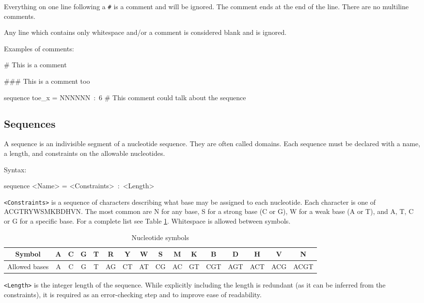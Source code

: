 \documentclass{article}
\newenvironment{code}
{\vspace{-0.1in}\par\begin{list}{}{
\setlength{\listparindent}{0pt}
\raggedright
\setlength{\itemsep}{0pt}
\setlength{\parsep}{0pt}
\normalfont\ttfamily}
 \item[]}
{\end{list}\vspace{-0.1in}}
\begin{document}
Everything on one line following a \texttt{\#} is a comment and will be ignored. The comment ends at the end of the line. There are no multiline comments.

Any line which contains only whitespace and/or a comment is considered blank and is ignored.

\pagebreak
Examples of comments:
\begin{code}
\# This is a comment

\#\#\# This is a comment too

sequence toe\_x = NNNNNN~:~6   \# This comment could talk about the sequence 
\end{code}

\subsection{Sequences}

A sequence is an indivisible segment of a nucleotide sequence. They are often called domains. Each sequence must be declared with a name, a length, and constraints on the allowable nucleotides.

Syntax:
\begin{code}
sequence <Name> = <Constraints>~:~<Length>
\end{code}
\texttt{<Constraints>} is a sequence of characters describing what base may be assigned to each nucleotide. Each character is one of ACGTRYWSMKBDHVN. The most common are N for any base, S for a strong base (C or G), W for a weak base (A or T), and A, T, C or G for a specific base. For a complete list see Table \ref{tab:Nucleotide-symbols}. Whitespace is allowed between symbols. 

\begin{table}[b]
\noindent \begin{centering}
\begin{tabular}{|c|c|c|c|c|c|c|c|c|c|c|c|c|c|c|c|}
\hline
Symbol & A & C & G & T & R & Y & W & S & M & K & B & D & H & V & N\\
\hline 
Allowed bases & A & C & G & T & AG & CT & AT & CG & AC & GT & CGT & AGT & ACT & ACG & ACGT\\
\hline
\end{tabular}
\par\end{centering}

\caption{\label{tab:Nucleotide-symbols}Nucleotide symbols}
\end{table}

\texttt{<Length>} is the integer length of the sequence. While explicitly including the length is redundant (as it can be inferred from the constraints), it is required as an error-checking step and to improve ease of readability.
\end{document}
